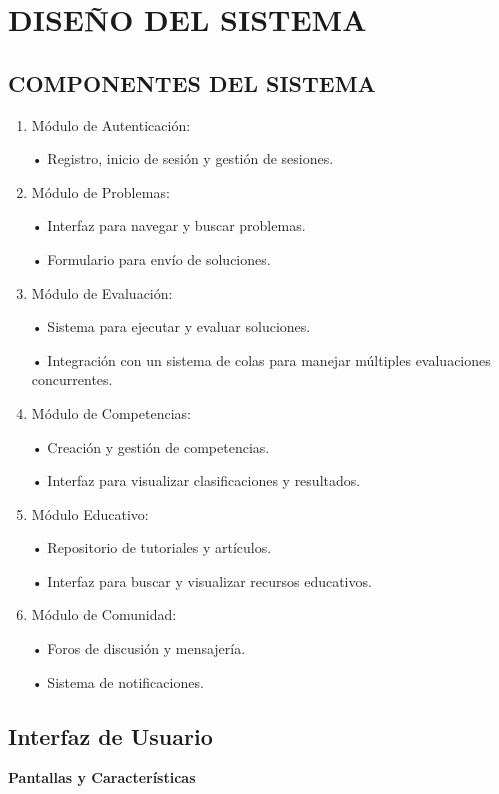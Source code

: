 \section{DISEÑO DEL SISTEMA}

\subsection{COMPONENTES DEL SISTEMA}

\begin{enumerate}
    \item Módulo de Autenticación:
    
	•	Registro, inicio de sesión y gestión de sesiones.
 
    \item Módulo de Problemas:
    
	•	Interfaz para navegar y buscar problemas.
 
	•	Formulario para envío de soluciones.
 
    \item Módulo de Evaluación:
    
	•	Sistema para ejecutar y evaluar soluciones.
 
	•	Integración con un sistema de colas para manejar múltiples evaluaciones concurrentes.
    \item Módulo de Competencias:
    
	•	Creación y gestión de competencias.
 
	•	Interfaz para visualizar clasificaciones y resultados.
    \item Módulo Educativo:
    
	•	Repositorio de tutoriales y artículos.
 
	•	Interfaz para buscar y visualizar recursos educativos.
    \item Módulo de Comunidad:
    
	•	Foros de discusión y mensajería.
 
	•	Sistema de notificaciones.
\end{enumerate}

\subsection{Interfaz de Usuario}

\textbf{Pantallas y Características}

